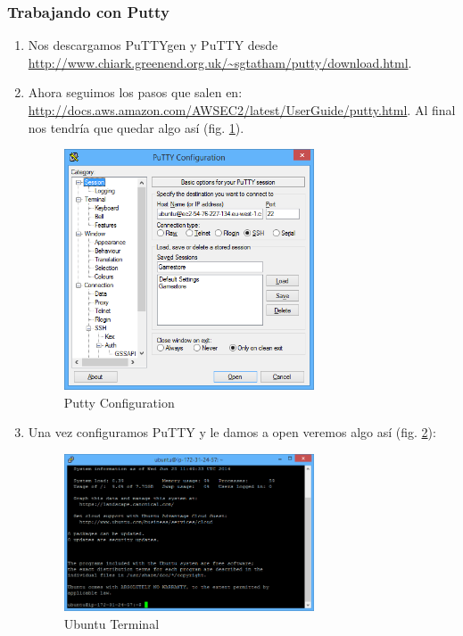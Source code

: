 \documentclass[a4paper,10pt]{scrartcl}
\begin{document}
\subsubsection{Trabajando con Putty}	
\begin{enumerate}
	\item Nos descargamos PuTTYgen y PuTTY desde \url{http://www.chiark.greenend.org.uk/~sgtatham/putty/download.html}.
	\item Ahora seguimos los pasos que salen en: \url{http://docs.aws.amazon.com/AWSEC2/latest/UserGuide/putty.html}. Al final nos tendría que quedar algo así (fig. \ref{fig: puttyconf}).
	\begin{figure}[htb!]
		\centering
		\includegraphics[width=0.7\textwidth] {putty_conf.png}
		\caption{Putty Configuration}
		\label{fig: puttyconf}
	\end{figure}
	\item Una vez configuramos PuTTY y le damos a open veremos algo así (fig. \ref{fig: ubuntuterminal}):
	\begin{figure}[htb!]
		\centering
		\includegraphics[width=0.7\textwidth] {ubuntuterminal.png}
		\caption{Ubuntu Terminal}
		\label{fig: ubuntuterminal}
	\end{figure}
\end{enumerate}
\end{document}
